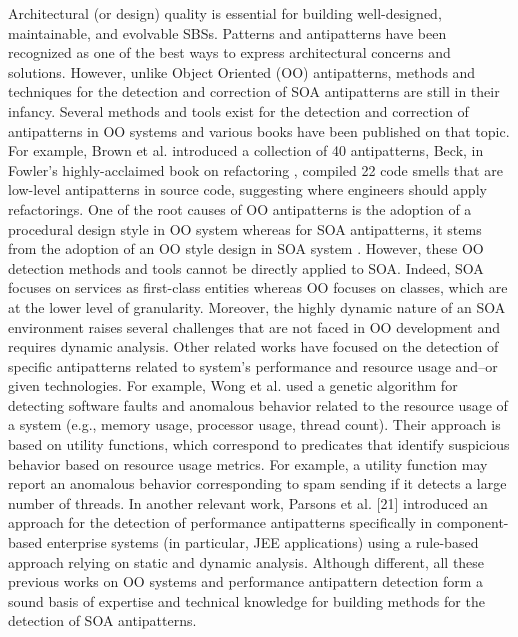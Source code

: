 Architectural (or design) quality is essential for building well-designed, maintainable,
and evolvable SBSs. Patterns and antipatterns have been recognized
as one of the best ways to express architectural concerns and solutions. However, unlike Object Oriented (OO) antipatterns, methods and techniques for the detection and correction of SOA antipatterns are still in their infancy. Several methods and tools exist for the detection \cite{DuBois04-WCRE-RefactoringCouplingCohesion, Kessentini10-ASE-Deviance, Lanza06-OOMetricsPractice, Munro05-BadSmellIdentification, Settas:2011:SSA:1943774.1943847} and correction  \cite{DuBois04-WCRE-RefactoringCouplingCohesion, Simon01-CSMR-MetricsBasedRefactoring, Trifu03-StrategyBasedDesignFlaws} of antipatterns in OO systems and various books have been published on that topic. For example, Brown et al. \cite{Brown98-AntiPatterns} introduced a collection of 40 antipatterns, Beck, in Fowler’s highly-acclaimed book on refactoring \cite{kentbeck},
compiled 22 code smells that are low-level antipatterns in source code, suggesting where engineers should apply refactorings. One of the root causes of OO antipatterns is the adoption of a procedural design style in OO system whereas for SOA antipatterns, it stems from the adoption of an OO style design in SOA
system \cite{Kral07-SOAAntipatterns}. However, these OO detection methods and tools cannot be directly
applied to SOA. Indeed, SOA focuses on services as first-class entities whereas
OO focuses on classes, which are at the lower level of granularity. Moreover, the
highly dynamic nature of an SOA environment raises several challenges that are
not faced in OO development and requires dynamic analysis.
Other related works have focused on the detection of specific antipatterns
related to system’s performance and resource usage and–or given technologies.
For example, Wong et al. \cite{Wong:2010:REU:1919284.1919587} used a genetic algorithm for detecting software
faults and anomalous behavior related to the resource usage of a system (e.g.,
memory usage, processor usage, thread count). Their approach is based on utility
functions, which correspond to predicates that identify suspicious behavior
based on resource usage metrics. For example, a utility function may report an
anomalous behavior corresponding to spam sending if it detects a large number
of threads. In another relevant work, Parsons et al. [21] introduced an approach
for the detection of performance antipatterns specifically in component-based
enterprise systems (in particular, JEE applications) using a rule-based approach
relying on static and dynamic analysis.
Although different, all these previous works on OO systems and performance
antipattern detection form a sound basis of expertise and technical knowledge
for building methods for the detection of SOA antipatterns.
